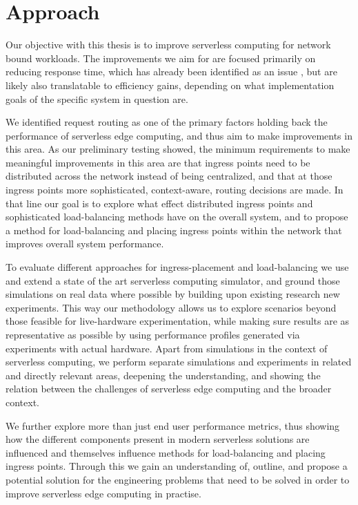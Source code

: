 \section{Approach}
Our objective with this thesis is to improve serverless computing for network bound workloads. 
The improvements we aim for are focused primarily on reducing response time, which has already been identified as an issue %
, but are likely also translatable to efficiency gains, depending on what implementation goals of the specific system in question are.


We identified request routing as one of the primary factors holding back the performance of serverless edge computing, and thus aim to make improvements in this area.
As our preliminary testing showed, the minimum requirements to make meaningful improvements in this area are that ingress points need to be distributed across the network  instead of being centralized, and that at those ingress points more sophisticated, context-aware, routing decisions are made.
In that line our goal is to explore what effect distributed ingress points and sophisticated load-balancing methods have on the overall system, and to propose a method for load-balancing and placing ingress points within the network that improves overall system performance.


To evaluate different approaches for ingress-placement and load-balancing we use and extend a state of the art serverless computing simulator, and ground those simulations on real data where possible by building upon existing research %
new experiments.
This way our methodology allows us to explore scenarios beyond those feasible for live-hardware experimentation, while making sure results are as representative as possible by using performance profiles generated via experiments with actual hardware. %
Apart from simulations in the context of serverless computing, we perform separate simulations and experiments in related and directly relevant areas, deepening the understanding, and showing the relation between the challenges of serverless edge computing and the broader context.

We further explore more than just end user performance metrics, thus showing how the different components present in modern serverless solutions are influenced and themselves influence methods for load-balancing and placing ingress points.
Through this we gain an understanding of, outline, and propose a potential solution for the engineering problems that need to be solved in order to improve serverless edge computing in practise.